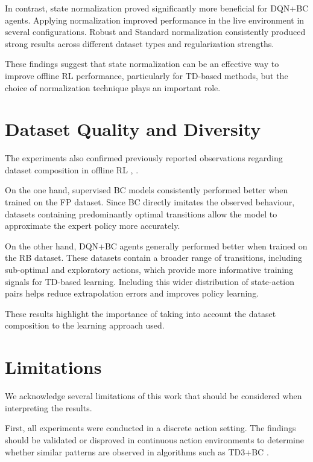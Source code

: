 In contrast, state normalization proved significantly more beneficial for DQN+BC agents. Applying normalization improved performance in the live environment in several configurations. Robust and Standard normalization consistently produced strong results across different dataset types and regularization strengths.

These findings suggest that state normalization can be an effective way to improve offline RL performance, particularly for TD-based methods, but the choice of normalization technique plays an important role.




\section{Dataset Quality and Diversity}

The experiments also confirmed previously reported observations regarding dataset composition in offline RL \cite{BC_ORL_only}, \cite{dataset_composition_rl_effects}.

On the one hand, supervised BC models consistently performed better when trained on the FP dataset. Since BC directly imitates the observed behaviour, datasets containing predominantly optimal transitions allow the model to approximate the expert policy more accurately.

On the other hand, DQN+BC agents generally performed better when trained on the RB dataset. These datasets contain a broader range of transitions, including sub-optimal and exploratory actions, which provide more informative training signals for TD-based learning. Including this wider distribution of state-action pairs helps reduce extrapolation errors and improves policy learning.

These results highlight the importance of taking into account the dataset composition to the learning approach used.

\section{Limitations}
We acknowledge several limitations of this work that should be considered when interpreting the results.

First, all experiments were conducted in a discrete action setting. The findings should be validated or disproved in continuous action environments to determine whether similar patterns are observed in algorithms such as TD3+BC \cite{fujimoto2021minimalist}.

